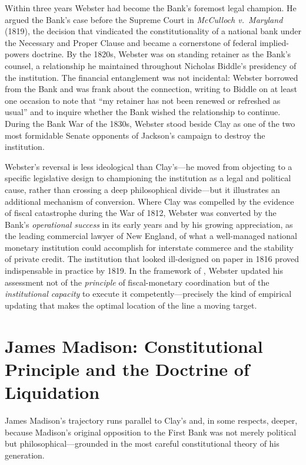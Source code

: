 \documentclass[12pt]{article}
\begin{document}
Within three years Webster had become the Bank's foremost legal
champion.  He argued the Bank's case before the Supreme Court in
\textit{McCulloch v.~Maryland} (1819), the decision that vindicated
the constitutionality of a national bank under the Necessary and Proper
Clause and became a cornerstone of federal implied-powers doctrine.
By the 1820s, Webster was on standing retainer as the Bank's counsel, a
relationship he maintained throughout Nicholas Biddle's presidency of
the institution.  The financial entanglement was not incidental: Webster
borrowed from the Bank and was frank about the connection, writing to
Biddle on at least one occasion to note that ``my retainer has not been
renewed or refreshed as usual'' and to inquire whether the Bank wished
the relationship to continue.  During the Bank War of the 1830s, Webster
stood beside Clay as one of the two most formidable Senate opponents of
Jackson's campaign to destroy the institution.

Webster's reversal is less ideological than Clay's---he moved from
objecting to a specific legislative design to championing the
institution as a legal and political cause, rather than crossing a deep
philosophical divide---but it illustrates an additional mechanism of
conversion.  Where Clay was compelled by the evidence of fiscal
catastrophe during the War of 1812, Webster was converted by the Bank's
\emph{operational success} in its early years and by his growing
appreciation, as the leading commercial lawyer of New England, of what
a well-managed national monetary institution could accomplish for
interstate commerce and the stability of private credit.  The
institution that looked ill-designed on paper in 1816 proved
indispensable in practice by 1819.  In the framework of
\citet{Sargent2011}, Webster updated his assessment not of the
\emph{principle} of fiscal-monetary coordination but of the
\emph{institutional capacity} to execute it competently---precisely
the kind of empirical updating that makes the optimal location of the
line a moving target.


\section{James Madison: Constitutional Principle and the Doctrine of
         Liquidation}

James Madison's trajectory runs parallel to Clay's and, in some respects,
deeper, because Madison's original opposition to the First Bank was not
merely political but philosophical---grounded in the most careful
constitutional theory of his generation.
\end{document}
